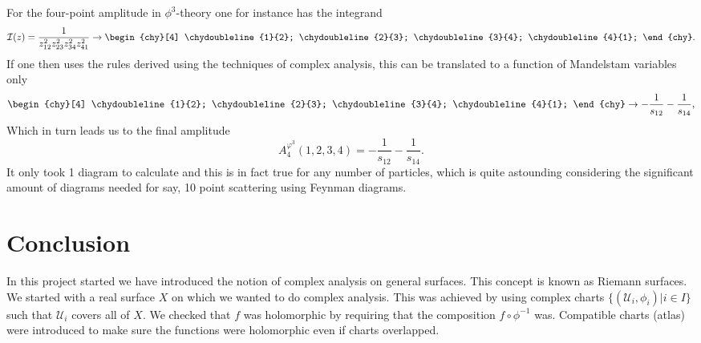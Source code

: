 \documentclass[lettersize,11pt]{article}
\begin{document}
For the four-point amplitude in $\phi^3$-theory one for instance has the integrand
\begin{equation} \label{eq:4pt-ex}
	\mathcal{I}(z)=\frac{1}{z_{12}^2z_{23}^2z_{34}^2z_{41}^2}\to
	\begin{chy}[4]
		\chydoubleline{1}{2};
		\chydoubleline{2}{3};
		\chydoubleline{3}{4};
		\chydoubleline{4}{1};
	\end{chy}.
\end{equation}
If one then uses the rules derived using the techniques of complex analysis, this can be translated to a function of Mandelstam variables only
\begin{equation} \label{eq:4pt-expr}
	\begin{chy}[4]
		\chydoubleline{1}{2};
		\chydoubleline{2}{3};
		\chydoubleline{3}{4};
		\chydoubleline{4}{1};
	\end{chy}
	\to
	-\frac{1}{s_{12}}-\frac{1}{s_{14}},
\end{equation}
Which in turn leads us to the final amplitude
\begin{equation}
	A_4^{\varphi^3}(1,2,3,4)=-\frac{1}{s_{12}}-\frac{1}{s_{14}}.
\end{equation}
It only took 1 diagram to calculate and this is in fact true for any number of particles, which is quite astounding considering the significant amount of diagrams needed for say, 10 point scattering using Feynman diagrams.
\section{Conclusion}
In this project started we have introduced the notion of complex analysis on general surfaces. This concept is known as Riemann surfaces. We started with a real surface $X$ on which we wanted to do complex analysis. This was achieved by using complex charts $\{(\mathcal{U}_i,\phi_i)\big|i\in I\}$ such that $\mathcal{U}_i$ covers all of $X$. We checked that $f$ was holomorphic by requiring that the composition $f\circ \phi^{-1}$ was. Compatible charts (atlas) were introduced to make sure the functions were holomorphic even if charts overlapped.
\end{document}
